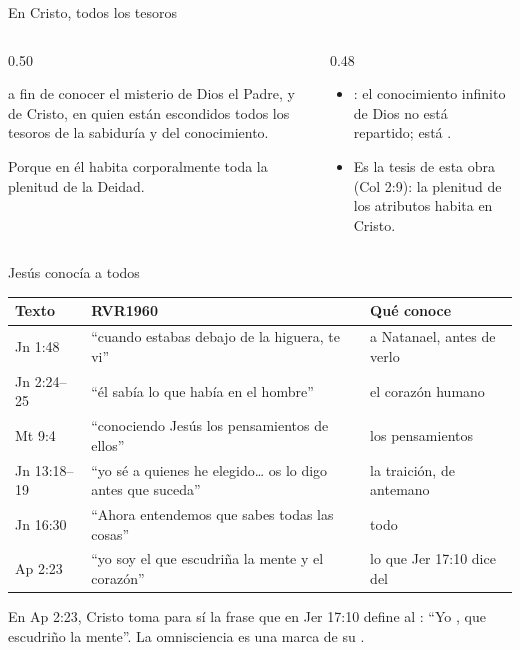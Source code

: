 \begin{frame}{En Cristo, todos los tesoros}
\begin{columns}[c,onlytextwidth]
\begin{column}{0.50\textwidth}
\begin{cita}a fin de conocer el misterio de Dios el Padre, y de Cristo, en quien están escondidos todos los tesoros de la sabiduría y del conocimiento.\end{cita}
\begin{cita}Porque en él habita corporalmente toda la plenitud de la Deidad.\end{cita}
\end{column}
\begin{column}{0.48\textwidth}\small
\begin{itemize}
\item {}: el conocimiento infinito de Dios no está repartido; está .
\item Es la tesis de esta obra (Col 2:9): la plenitud de los atributos habita en Cristo.
\end{itemize}
\end{column}
\end{columns}
\end{frame}

\begin{frame}{Jesús conocía a todos}
\scriptsize\renewcommand{\arraystretch}{1.18}
\begin{tabular}{@{}>{\RaggedRight\arraybackslash}p{1.6cm}>{\RaggedRight\arraybackslash}p{6.2cm}>{\RaggedRight\arraybackslash}p{4.0cm}@{}}
\toprule
\textbf{Texto} & \textbf{RVR1960} & \textbf{Qué conoce} \\ \midrule
Jn 1:48 & ``cuando estabas debajo de la higuera, te vi'' & a Natanael, antes de verlo \\
Jn 2:24--25 & ``él sabía lo que había en el hombre'' & el corazón humano \\
Mt 9:4 & ``conociendo Jesús los pensamientos de ellos'' & los pensamientos \\
Jn 13:18--19 & ``yo sé a quienes he elegido\ldots{} os lo digo antes que suceda'' & la traición, de antemano \\
Jn 16:30 & ``Ahora entendemos que sabes todas las cosas'' & todo \\
Ap 2:23 & ``yo soy el que escudriña la mente y el corazón'' & lo que Jer 17:10 dice del \SENOR{} \\
\bottomrule
\end{tabular}\par\medskip
\small\RaggedRight En Ap 2:23, Cristo toma para sí la frase que en Jer 17:10 define al \SENOR{}: ``Yo \SENOR{}, que escudriño la mente''. La omnisciencia es una marca de su .\par\smallskip
{}
\end{frame}

